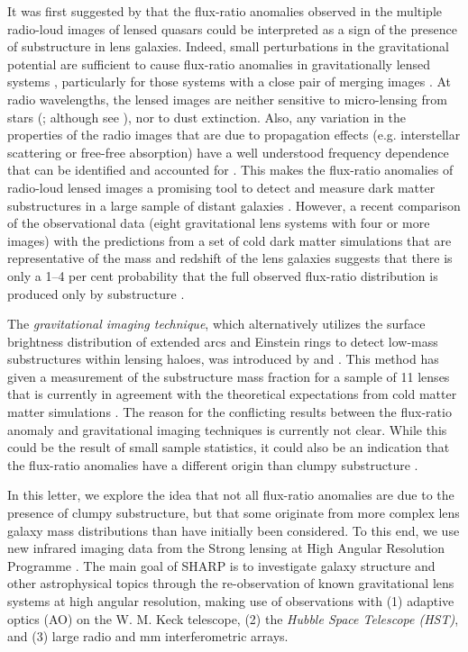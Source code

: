 \documentclass[a4paper,fleqn,usenatbib,useAMS]{mnras}
\begin{document}
It was first suggested by \citet{Mao1998} that the flux-ratio anomalies observed in the multiple radio-loud images of lensed quasars could be interpreted as a sign of the presence of substructure in lens galaxies. Indeed, small perturbations in the gravitational potential are sufficient to cause flux-ratio anomalies in gravitationally lensed systems \citep{metcalf01,Dalal2002,Bradac02}, particularly for those systems with a close pair of merging images \citep{KD04}. At radio wavelengths, the lensed images are neither sensitive to micro-lensing from stars (\citealt{K03}; although see \citealt{koopmans00}), nor to dust extinction. Also, any variation in the properties of the radio images that are due to propagation effects (e.g. interstellar scattering or free-free absorption) have a well understood frequency dependence that can be identified and accounted for \citep[e.g.][]{biggs03,M07,winn04}. This makes the flux-ratio anomalies of radio-loud lensed images a promising tool to detect and measure dark matter substructures in a large sample of distant galaxies \citep{Dalal2002}. However, a recent comparison of the observational data (eight gravitational lens systems with four or more images) with the predictions from a set of cold dark matter simulations that are representative of the mass and redshift of the lens galaxies suggests that there is only a 1--4 per cent probability that the full observed flux-ratio distribution is produced only by substructure \citep{Xu15}.

The \emph{gravitational imaging technique}, which alternatively utilizes the surface brightness distribution of extended arcs and Einstein rings to detect low-mass substructures within lensing haloes, was introduced by \citet{K05} and \citet{V09}. This method has given a measurement of the substructure mass fraction for a sample of 11 lenses that is currently in agreement with the theoretical expectations from cold matter matter simulations \citep{V14a,V12}. The reason for the conflicting results between the flux-ratio anomaly and gravitational imaging techniques is currently not clear.  While this could be the result of small sample statistics, it could also be an indication that the flux-ratio anomalies have a different origin than clumpy substructure \citep[see][for a discussion]{Xu15}.

 
In this letter, we explore the idea that not all flux-ratio anomalies are due to the presence of clumpy substructure, but that some originate from more complex lens galaxy mass distributions than have initially been considered. To this end, we use new infrared imaging data from the Strong lensing at High Angular Resolution Programme \citep[SHARP;][]{mckean07,lagattuta10,SHARP12, V12}. The main goal of SHARP is to investigate galaxy structure and other astrophysical topics through the re-observation of known gravitational lens systems at high angular resolution, making use of observations with (1) adaptive optics (AO) on the W. M. Keck telescope, (2) the {\it Hubble Space Telescope (HST)}, and (3) large radio and mm interferometric arrays. 
\end{document}
